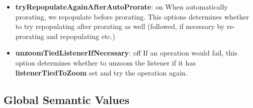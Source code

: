 \begin{itemize}
\item {\bf tryRepopulateAgainAfterAutoProrate}: on\newline{}
When automatically prorating, we repopulate before prorating.
This options determines whether to try repopulating after
prorating as well (followed, if necessary by re-prorating and
repopulating etc.)

\item {\bf unzoomTiedListenerIfNecessary}: off\newline{}
If an operation would fail, this option determines whether to
unzoom the listener if it has {\bf listenerTiedToZoom} set and try the
operation again.
\end{itemize}

\subsection{Global Semantic Values}

